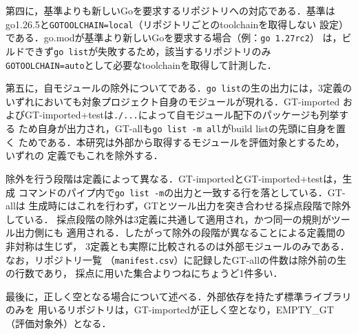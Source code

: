 \documentclass{css}
\def\|{\verb|}
\begin{document}
第四に，基準よりも新しいGoを要求するリポジトリへの対応である．基準は
go1.26.5と\texttt{GOTOOLCHAIN=local}（リポジトリごとのtoolchainを取得しない
設定）である．go.modが基準より新しいGoを要求する場合（例：\texttt{go 1.27rc2}）
は，ビルドできず\|go list|が失敗するため，該当するリポジトリのみ
\texttt{GOTOOLCHAIN=auto}として必要なtoolchainを取得して計測した．

第五に，自モジュールの除外についてである．\|go list|の生の出力には，3定義の
いずれにおいても対象プロジェクト自身のモジュールが現れる．GT-imported
およびGT-imported+testは\|./...|によって自モジュール配下のパッケージも列挙する
ため自身が出力され，GT-allも\|go list -m all|がbuild listの先頭に自身を置く
ためである．本研究は外部から取得するモジュールを評価対象とするため，いずれの
定義でもこれを除外する．

除外を行う段階は定義によって異なる．GT-importedとGT-imported+testは，生成
コマンドのパイプ内で\|go list -m|の出力と一致する行を落としている．GT-allは
生成時にはこれを行わず，GTとツール出力を突き合わせる採点段階で除外している．
採点段階の除外は3定義に共通して適用され，かつ同一の規則がツール出力側にも
適用される．したがって除外の段階が異なることによる定義間の非対称は生じず，
3定義とも実際に比較されるのは外部モジュールのみである．なお，リポジトリ一覧
（\texttt{manifest.csv}）に記録したGT-allの件数は除外前の生の行数であり，
採点に用いた集合よりつねにちょうど1件多い．

最後に，正しく空となる場合について述べる．外部依存を持たず標準ライブラリのみを
用いるリポジトリは，GT-importedが正しく空となり，EMPTY\_GT（評価対象外）となる．
\end{document}
